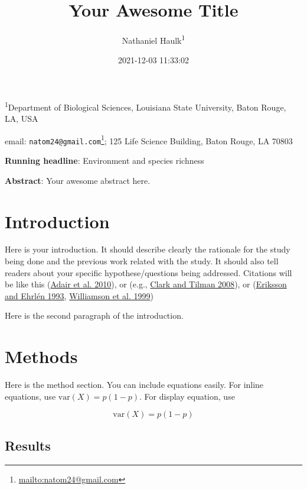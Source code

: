 \documentclass[
  12pt,
]{article}
\title{Your Awesome Title}
\author{Nathaniel Haulk\textsuperscript{1}}
\date{2021-12-03 11:33:02}
\DeclareRobustCommand{\href}[2]{#2\footnote{\url{#1}}}
\begin{document}
\maketitle

\renewcommand{\figurename}{{\textbf{Figure}}}
\renewcommand{\tablename}{{\textbf{Table}}}

\footnotesize

\textsuperscript{1}Department of Biological Sciences, Louisiana State University, Baton Rouge, LA, USA

email: \href{mailto:natom24@gmail.com}{\nolinkurl{natom24@gmail.com}}; 125 Life Science Building, Baton Rouge, LA 70803

\normalsize

\textbf{Running headline}: Environment and species richness

\textbf{Abstract}: Your awesome abstract here.

\clearpage

\hypertarget{introduction}{%
\section{Introduction}\label{introduction}}

Here is your introduction. It should describe clearly the rationale for the study being done and the previous work related with the study. It should also tell readers about your specific hypothese/questions being addressed. Citations will be like this (\protect\hyperlink{ref-adair_single-pool_2010}{Adair et al. 2010}), or (e.g., \protect\hyperlink{ref-clark_loss_2008}{Clark and Tilman 2008}), or (\protect\hyperlink{ref-eriksson_seed_1993}{Eriksson and Ehrlén 1993}, \protect\hyperlink{ref-williamson_dissolved_1999}{Williamson et al. 1999})

Here is the second paragraph of the introduction.

\hypertarget{methods}{%
\section{Methods}\label{methods}}

Here is the method section. You can include equations easily. For inline equations, use \(\text{var}(X) = p(1-p)\). For display equation, use

\[\text{var}(X) = p(1-p)\]

\hypertarget{results}{%
\subsection{Results}\label{results}}
\end{document}
